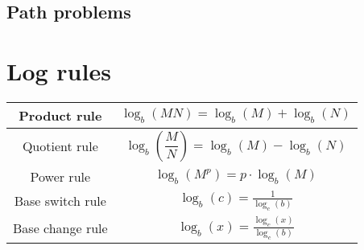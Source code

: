 \documentclass{article}
\begin{document}
\subsection{Path problems}

\section{Log rules}
\begin{tabular}{|c|c|}
    \hline
    Product rule & $\log_b(MN)=\log_b(M)+\log_b(N)$ \\
    \hline
    Quotient rule & $\log_b\left(\dfrac{M}{N}\right)=\log_b(M)-\log_b(N)$ \\
    \hline Power rule & $\log_b(M^p)=p\cdot\log_b(M)$\\
    \hline Base switch rule & $\log_b(c)=\frac{1}{\log_c(b)}$\\
    \hline Base change rule & $\log_b(x)=\frac{\log_c(x)}{\log_c(b)}$\\
    \hline
    \end{tabular}




\end{document}
